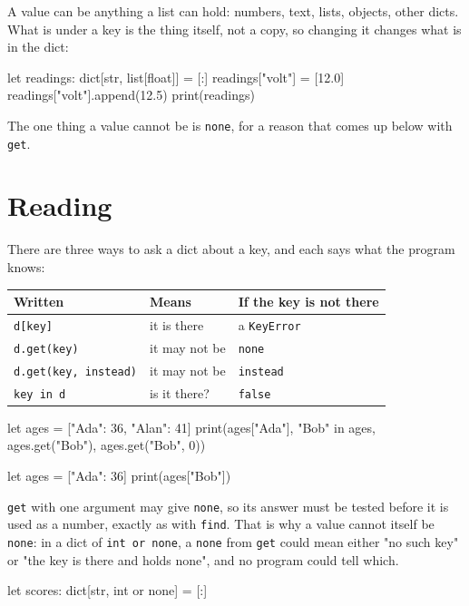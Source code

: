A value can be anything a list can hold: numbers, text, lists,
objects, other dicts. What is under a key is the thing itself, not a
copy, so changing it changes what is in the dict:

\begin{zeno}
let readings: dict[str, list[float]] = [:]
readings["volt"] = [12.0]
readings["volt"].append(12.5)
print(readings)
\end{zeno}

The one thing a value cannot be is \verb|none|, for a reason that comes
up below with \verb|get|.

\section{Reading}

There are three ways to ask a dict about a key, and each says what the
program knows:

\begin{center}
\begin{tabular}{lll}
\toprule
Written & Means & If the key is not there \\
\midrule
\verb|d[key]| & it is there & a \verb|KeyError| \\
\verb|d.get(key)| & it may not be & \verb|none| \\
\verb|d.get(key, instead)| & it may not be & \verb|instead| \\
\verb|key in d| & is it there? & \verb|false| \\
\bottomrule
\end{tabular}
\end{center}

\begin{zeno}
let ages = ["Ada": 36, "Alan": 41]
print(ages["Ada"], "Bob" in ages, ages.get("Bob"), ages.get("Bob", 0))
\end{zeno}

\begin{zeno}[fails=yes]
let ages = ["Ada": 36]
print(ages["Bob"])
\end{zeno}

\verb|get| with one argument may give \verb|none|, so its answer must be
tested before it is used as a number, exactly as with \verb|find|. That
is why a value cannot itself be \verb|none|: in a dict of
\verb|int or none|, a \verb|none| from \verb|get| could mean either
"no such key" or "the key is there and holds none", and no program
could tell which.

\begin{zeno}[fails=yes]
let scores: dict[str, int or none] = [:]
\end{zeno}

